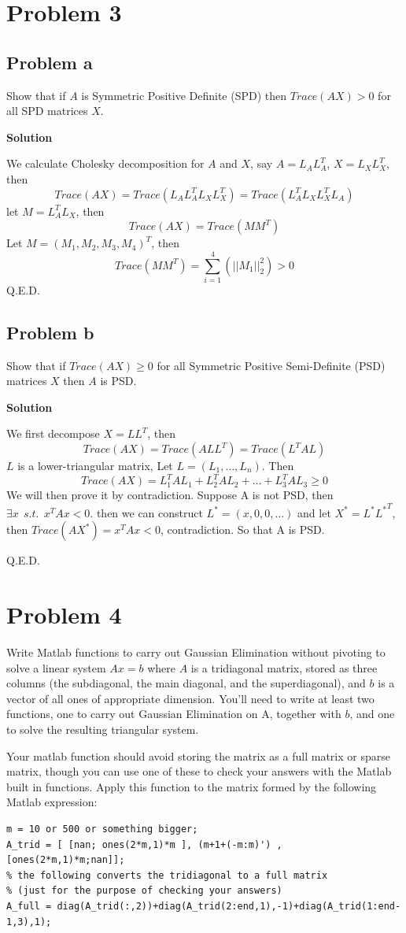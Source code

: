 \documentclass[12pt,oneside,a4paper]{article}
\newcommand{\problem}[1]
{
    \clearpage
    \section*{Problem {#1}}
}
\newcommand{\subproblem}[1]
{
    \subsection*{Problem {#1}}
}
\newcommand{\solution}
{
    \vspace{15pt}
    \noindent\ignorespaces\textbf{\large Solution}\par
}
\begin{document}
\problem{3}

\subproblem{a}
Show that if $A$ is Symmetric Positive Definite (SPD) then $Trace(AX) > 0$ for all SPD matrices $X$.

\solution
We calculate Cholesky decomposition for $A$ and $X$, say $A = L_{A}L_{A}^{T}$, $X = L_{X}L_{X}^{T}$, then
$$Trace(AX) = Trace(L_{A}L_{A}^{T}L_{X}L_{X}^{T}) = Trace(L_{A}^{T}L_{X}L_{X}^{T}L_{A})$$
let $M = L_{A}^{T}L_{X}$, then 
$$Trace(AX) = Trace(MM^{T})$$
Let $M = (M_{1}, M_{2}, M_{3}, M_{4})^{T}$, then 
$$Trace(MM^{T}) = \sum_{i = 1}^{4}(||M_{1}||_{2}^{2}) > 0 $$
Q.E.D.

\subproblem{b}
Show that if $Trace(AX) \geq 0$ for all Symmetric Positive Semi-Definite (PSD) matrices $X$ then $A$ is PSD.

\solution
We first decompose $X = LL^{T}$, then
$$Trace(AX) = Trace(ALL^{T}) = Trace(L^{T}AL)$$
$L$ is a lower-triangular matrix, Let $L = (L_{1},\dots,L_{n})$. Then
$$Trace(AX) = L_{1}^{T}AL_{1} + L_{2}^{T}AL_{2} + \dots + L_{3}^{T}AL_{3} \geq 0$$
We will then prove it by contradiction. Suppose A is not PSD, then $\exists x~~s.t.~~x^{T}Ax < 0$. then we can construct $L^{*} = (x, 0, 0, \dots)$ and let $X^{*} = L^{*}{L^{*}}^{T}$, then $Trace(AX^{*}) =  x^{T}Ax < 0$, contradiction. So that A is PSD.\par Q.E.D.

\problem{4}
Write Matlab functions to carry out Gaussian Elimination without pivoting to solve a linear system $Ax = b$ where $A$ is a tridiagonal matrix, stored as three columns (the subdiagonal, the main diagonal, and the superdiagonal), and $b$ is a vector of all ones of appropriate dimension. You’ll need to write at least two functions, one to carry out Gaussian Elimination on A, together with $b$, and one to solve the resulting triangular system.

Your matlab function should avoid storing the matrix as a full matrix or sparse matrix, though you can use one of these to check your answers with the Matlab built in functions. Apply this function to the matrix formed by the following Matlab expression:

\begin{verbatim}
m = 10 or 500 or something bigger;
A_trid = [ [nan; ones(2*m,1)*m ], (m+1+(-m:m)') , [ones(2*m,1)*m;nan]];
% the following converts the tridiagonal to a full matrix
% (just for the purpose of checking your answers)
A_full = diag(A_trid(:,2))+diag(A_trid(2:end,1),-1)+diag(A_trid(1:end-1,3),1);
\end{verbatim}
\end{document}
